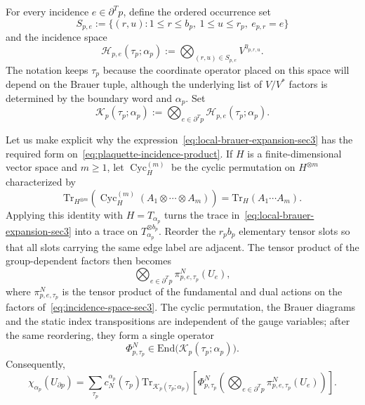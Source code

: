 \documentclass[11pt,a4paper,reqno]{article}
\theoremstyle{definition}
\theoremstyle{remark}
\newcommand\Tr{\mathrm{Tr}}
\newcommand\End{{\mathrm{End}}}
\begin{document}
For every incidence $e\in\partial^Tp$, define the ordered occurrence set
\[
S_{p,e}:=\{(r,u):1\le r\le b_p,\ 1\le u\le r_p,\ e_{p,r}=e\}
\]
and the incidence space
\begin{equation}\label{eq:incidence-space-sec3}
\mathcal H_{p,e}(\tau_p;\alpha_p):=
\bigotimes_{(r,u)\in S_{p,e}}V^{\eta_{p,r,u}}.
\end{equation}
The notation keeps $\tau_p$ because the coordinate operator placed on this space will depend on the Brauer tuple, although the underlying list of $V/V^*$ factors is determined by the boundary word and $\alpha_p$. Set
\begin{equation}\label{eq:plaquette-incidence-product}
\mathcal K_p(\tau_p;\alpha_p)
:=\bigotimes_{e\in\partial^Tp}\mathcal H_{p,e}(\tau_p;\alpha_p).
\end{equation}

Let us make explicit why the expression~\eqref{eq:local-brauer-expansion-sec3} has the required form on~\eqref{eq:plaquette-incidence-product}. If $H$ is a finite-dimensional vector space and $m\ge1$, let $\operatorname{Cyc}^{(m)}_H$ be the cyclic permutation on $H^{\otimes m}$ characterized by
\[
\Tr_{H^{\otimes m}}\!\left(\operatorname{Cyc}^{(m)}_H(A_1\otimes\cdots\otimes A_m)\right)
=\Tr_H(A_1\cdots A_m).
\]
Applying this identity with $H=T_{\alpha_p}$ turns the trace in~\eqref{eq:local-brauer-expansion-sec3} into a trace on $T_{\alpha_p}^{\otimes b_p}$. Reorder the $r_pb_p$ elementary tensor slots so that all slots carrying the same edge label are adjacent. The tensor product of the group-dependent factors then becomes
\[
\bigotimes_{e\in\partial^Tp}\pi^N_{p,e,\tau_p}(U_e),
\]
where $\pi^N_{p,e,\tau_p}$ is the tensor product of the fundamental and dual actions on the factors of~\eqref{eq:incidence-space-sec3}. The cyclic permutation, the Brauer diagrams and the static index transpositions are independent of the gauge variables; after the same reordering, they form a single operator
\[
\Phi^N_{p,\tau_p}\in\End\bigl(\mathcal K_p(\tau_p;\alpha_p)\bigr).
\]
Consequently,
\begin{equation}\label{eq:plaquette-operator-form}
\chi_{\alpha_p}(U_{\partial p})
=\sum_{\tau_p}c_N^{\alpha_p}(\tau_p)
\Tr_{\mathcal K_p(\tau_p;\alpha_p)}\!\left[
\Phi^N_{p,\tau_p}
\left(\bigotimes_{e\in\partial^Tp}\pi^N_{p,e,\tau_p}(U_e)\right)
\right].
\end{equation}
\end{document}
